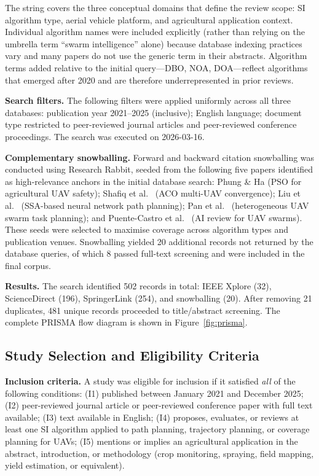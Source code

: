 \documentclass[review,3p,times]{elsarticle}
\begin{document}
The string covers the three conceptual domains that define the review scope: SI algorithm type, aerial vehicle platform, and agricultural application context. Individual algorithm names were included explicitly (rather than relying on the umbrella term ``swarm intelligence'' alone) because database indexing practices vary and many papers do not use the generic term in their abstracts. Algorithm terms added relative to the initial query---DBO, NOA, DOA---reflect algorithms that emerged after 2020 and are therefore underrepresented in prior reviews.

\textbf{Search filters.} The following filters were applied uniformly across all three databases: publication year 2021--2025 (inclusive); English language; document type restricted to peer-reviewed journal articles and peer-reviewed conference proceedings. The search was executed on 2026-03-16.

\textbf{Complementary snowballing.} Forward and backward citation snowballing was conducted using Research Rabbit, seeded from the following five papers identified as high-relevance anchors in the initial database search: Phung \& Ha \cite{phung2021} (PSO for agricultural UAV safety); Shafiq et al.\ \cite{shafiq2022} (ACO multi-UAV convergence); Liu et al.\ \cite{liu2021} (SSA-based neural network path planning); Pan et al.\ \cite{pan2022} (heterogeneous UAV swarm task planning); and Puente-Castro et al.\ \cite{puente2022} (AI review for UAV swarms). These seeds were selected to maximise coverage across algorithm types and publication venues. Snowballing yielded 20 additional records not returned by the database queries, of which 8 passed full-text screening and were included in the final corpus.

\textbf{Results.} The search identified 502 records in total: IEEE Xplore (32), ScienceDirect (196), SpringerLink (254), and snowballing (20). After removing 21 duplicates, 481 unique records proceeded to title/abstract screening. The complete PRISMA flow diagram is shown in Figure~\ref{fig:prisma}.

\subsection{Study Selection and Eligibility Criteria}

\textbf{Inclusion criteria.} A study was eligible for inclusion if it satisfied \textit{all} of the following conditions: (I1) published between January 2021 and December 2025; (I2) peer-reviewed journal article or peer-reviewed conference paper with full text available; (I3) text available in English; (I4) proposes, evaluates, or reviews at least one SI algorithm applied to path planning, trajectory planning, or coverage planning for UAVs; (I5) mentions or implies an agricultural application in the abstract, introduction, or methodology (crop monitoring, spraying, field mapping, yield estimation, or equivalent).
\end{document}
